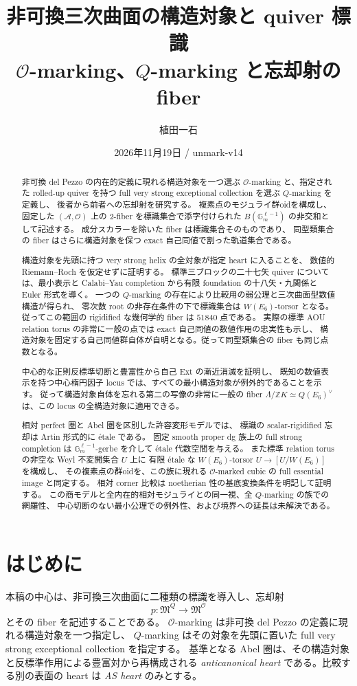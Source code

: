 \documentclass[11pt,a4paper]{ltjsarticle}
\title{非可換三次曲面の構造対象と quiver 標識\\\large $\mathcal O$-marking、$Q$-marking と忘却射の fiber}
\author{植田一石}
\date{2026年11月19日 / unmark-v14}
\theoremstyle{definition}\newtheorem{remark}[theorem]{注意}
\newcommand{\OO}{\mathcal O}\newcommand{\rank}{\operatorname{rank}}
\begin{document}
\maketitle
\begin{abstract}
非可換 del Pezzo の内在的定義に現れる構造対象を一つ選ぶ
$\mathcal O$-marking と、指定された rolled-up quiver を持つ
full very strong exceptional collection を選ぶ $Q$-marking を定義し、
後者から前者への忘却射を研究する。
複素点のモジュライ群oidを構成し、固定した $(\mathcal A,\OO)$ 上の
$2$-fiber を標識集合で添字付けられた $B(\mathbb G_m^{\ell-1})$ の非交和として記述する。
成分スカラーを除いた fiber は標識集合そのものであり、
同型類集合の fiber はさらに構造対象を保つ exact 自己同値で割った軌道集合である。

構造対象を先頭に持つ very strong helix の全対象が指定 heart に入ることを、
数値的 Riemann--Roch を仮定せずに証明する。
標準三ブロックの二十七矢 quiver については、最小表示と
Calabi--Yau completion から有限 foundation の十八矢・九関係と Euler 形式を導く。
一つの $Q$-marking の存在により比較用の弱公理と三次曲面型数値構造が得られ、
零次数 root の非存在条件の下で標識集合は $W(E_6)$-torsor となる。
従ってこの範囲の rigidified な幾何学的 fiber は $51840$ 点である。
実際の標準 AOU relation torus の非常に一般の点では
exact 自己同値の数値作用の忠実性も示し、
構造対象を固定する自己同値群自体が自明となる。従って同型類集合の fiber も同じ点数となる。

中心的な正則反標準切断と豊富性から自己 Ext の漸近消滅を証明し、
既知の数値表示を持つ中心楕円因子 locus では、すべての最小構造対象が例外的であることを示す。
従って構造対象自体を忘れる第二の写像の非常に一般の fiber
$\Lambda/\mathbb ZK\simeq Q(E_6)^\vee$ は、この locus の全構造対象に適用できる。

相対 perfect 圏と Abel 圏を区別した許容変形モデルでは、
標識の scalar-rigidified 忘却は Artin 形式的に \'etale である。
固定 smooth proper dg 族上の full strong completion は
$\mathbb G_m^{\ell-1}$-gerbe を介して \'etale 代数空間を与える。
また標準 relation torus の非空な Weyl 不変開集合 $U$ 上に
有限 \'etale な $W(E_6)$-torsor $U\to[U/W(E_6)]$ を構成し、
その複素点の群oidを、この族に現れる $\mathcal O$-marked cubic の full essential image と同定する。
相対 corner 比較は noetherian 性の基底変換条件を明記して証明する。
この商モデルと全内在的相対モジュライとの同一視、全 $Q$-marking の族での網羅性、
中心切断のない最小公理での例外性、および境界への延長は未解決である。
\end{abstract}
{\small\tableofcontents}
\clearpage
\section{はじめに}
本稿の中心は、非可換三次曲面に二種類の標識を導入し、忘却射
\[
 p:\mathfrak M^Q\longrightarrow\mathfrak M^{\OO}
\]
とその fiber を記述することである。
$\mathcal O$-marking は非可換 del Pezzo の定義に現れる構造対象を一つ指定し、
$Q$-marking はその対象を先頭に置いた full very strong exceptional collection を指定する。
基準となる Abel 圏は、その構造対象と反標準作用による豊富対から再構成される
\emph{anticanonical heart} である。比較する別の表面の heart は \emph{AS heart} のみとする。
\end{document}
